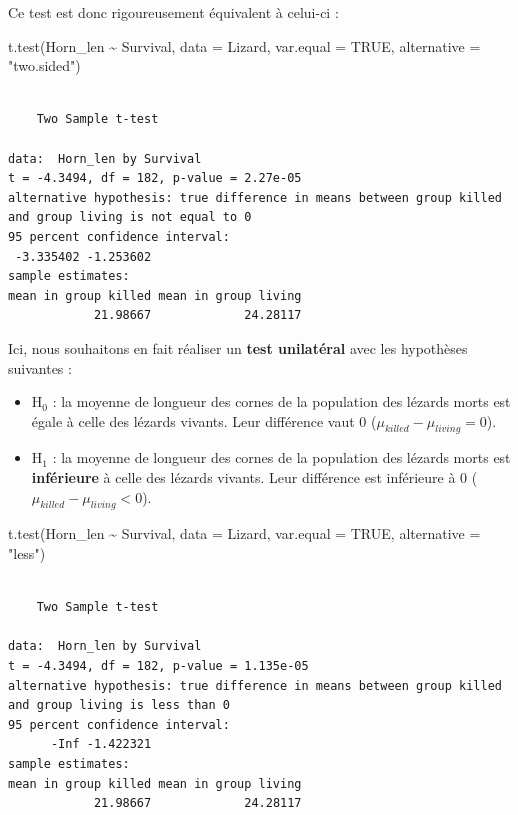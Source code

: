 \documentclass[
  a4paper,
  DIV=11,
  numbers=noendperiod,
  oneside]{scrreprt}
\newenvironment{Shaded}{}{}
\newcommand{\AttributeTok}[1]{\textcolor[rgb]{0.84,0.23,0.29}{#1}}
\newcommand{\ConstantTok}[1]{\textcolor[rgb]{0.00,0.36,0.77}{#1}}
\newcommand{\FunctionTok}[1]{\textcolor[rgb]{0.44,0.26,0.76}{#1}}
\newcommand{\NormalTok}[1]{\textcolor[rgb]{0.14,0.16,0.18}{#1}}
\newcommand{\SpecialCharTok}[1]{\textcolor[rgb]{0.00,0.36,0.77}{#1}}
\newcommand{\StringTok}[1]{\textcolor[rgb]{0.01,0.18,0.38}{#1}}
\providecommand{\tightlist}{%
  \setlength{\itemsep}{0pt}\setlength{\parskip}{0pt}}\usepackage{longtable,booktabs,array}
\begin{document}
Ce test est donc rigoureusement équivalent à celui-ci :

\begin{Shaded}
\begin{Highlighting}[]
\FunctionTok{t.test}\NormalTok{(Horn\_len }\SpecialCharTok{\textasciitilde{}}\NormalTok{ Survival, }\AttributeTok{data =}\NormalTok{ Lizard, }\AttributeTok{var.equal =} \ConstantTok{TRUE}\NormalTok{,}
       \AttributeTok{alternative =} \StringTok{"two.sided"}\NormalTok{)}
\end{Highlighting}
\end{Shaded}

\begin{verbatim}

    Two Sample t-test

data:  Horn_len by Survival
t = -4.3494, df = 182, p-value = 2.27e-05
alternative hypothesis: true difference in means between group killed and group living is not equal to 0
95 percent confidence interval:
 -3.335402 -1.253602
sample estimates:
mean in group killed mean in group living 
            21.98667             24.28117 
\end{verbatim}

Ici, nous souhaitons en fait réaliser un \textbf{test unilatéral} avec
les hypothèses suivantes :

\begin{itemize}
\tightlist
\item
  H\(_0\) : la moyenne de longueur des cornes de la population des
  lézards morts est égale à celle des lézards vivants. Leur différence
  vaut 0 (\(\mu_{killed}-\mu_{living} = 0\)).
\item
  H\(_1\) : la moyenne de longueur des cornes de la population des
  lézards morts est \textbf{inférieure} à celle des lézards vivants.
  Leur différence est inférieure à 0
  (\(\mu_{killed}-\mu_{living} < 0\)).
\end{itemize}

\begin{Shaded}
\begin{Highlighting}[]
\FunctionTok{t.test}\NormalTok{(Horn\_len }\SpecialCharTok{\textasciitilde{}}\NormalTok{ Survival, }\AttributeTok{data =}\NormalTok{ Lizard, }\AttributeTok{var.equal =} \ConstantTok{TRUE}\NormalTok{,}
       \AttributeTok{alternative =} \StringTok{"less"}\NormalTok{)}
\end{Highlighting}
\end{Shaded}

\begin{verbatim}

    Two Sample t-test

data:  Horn_len by Survival
t = -4.3494, df = 182, p-value = 1.135e-05
alternative hypothesis: true difference in means between group killed and group living is less than 0
95 percent confidence interval:
      -Inf -1.422321
sample estimates:
mean in group killed mean in group living 
            21.98667             24.28117 
\end{verbatim}
\end{document}
